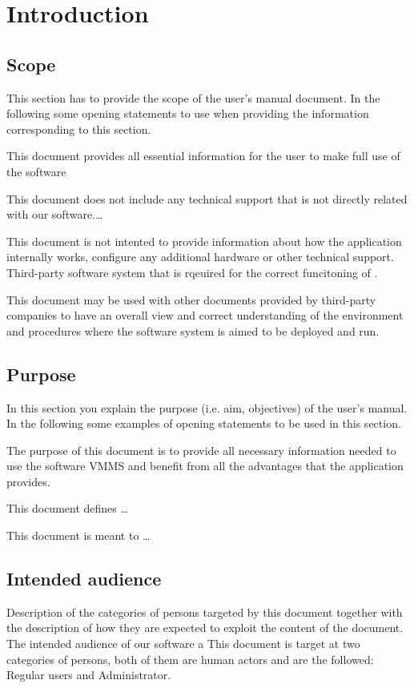 \chapter{Introduction}
\label{chap:introduction}

\section{Scope}
 
This section has to provide the scope of the user's manual document.
In the following some opening statements to use when providing the
information corresponding to this section.

This document provides all essential information for the user to make full
use of the software \mysystemname


This document does not include any technical support that is not directly
related with our software.\ldots
 
This document is not intented to provide information about how the application
internally works, configure any additional hardware or other technical
support. Third-party software system that is rqeuired for the correct
funcitoning of \mysystemname.

 
This document may be used with other documents provided by third-party
companies to have an overall view and correct understanding of the environment
and procedures where the software system \mysystemname is aimed to be deployed
and run.




\section{Purpose}
In this section you explain the purpose (i.e. aim, objectives) of the user's
manual. In the following some examples of opening statements to be used in this
section.

The purpose of this document is to provide all necessary information
needed to use the software VMMS and benefit from all the advantages that the
application provides.

This document defines \ldots

This document is meant to \ldots



\section{Intended audience}
Description of the categories of persons targeted by this document together with the description of how they are expected to exploit the content of the document.
The intended audience of our software a
This document is target at two categories of persons, both of them are human
actors and are the followed: Regular users and Administrator.\\\\


